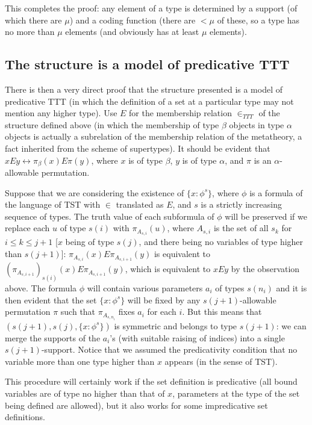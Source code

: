 \documentclass[112pt]{article}
\begin{document}
This completes the proof:  any element of a type is determined by a support (of which there are $\mu$) and a coding function (there are $<\mu$ of these, so a type has no more than $\mu$ elements (and obviously has at least $\mu$ elements).

\newpage
\subsection{The structure is a model of predicative TTT}

There is then a very direct proof that the structure presented is a model of predicative TTT (in which the definition of a set at a particular type may not mention any higher type).  Use $E$ for the membership relation $\in_{TTT}$ of the structure defined above (in which the membership of type $\beta$ objects in type $\alpha$ objects is actually a subrelation of the membership relation of the metatheory, a fact inherited from the scheme of supertypes).  It should be evident that $x E y \leftrightarrow \pi_\beta(x) E \pi(y)$,
where $x$ is of type $\beta$, $y$ is of type $\alpha$, and $\pi$ is an $\alpha$-allowable permutation.

Suppose that we are considering the existence of $\{x : \phi^s\}$, where $\phi$ is a formula of the language of TST with $\in$ translated as $E$, and $s$ is a strictly increasing sequence of types.  The truth value of each subformula of $\phi$ will be preserved if we replace each $u$ of type $s(i)$ with $\pi_{A_{s,i}}(u)$, where  $A_{s,i}$ is the set of all $s_k$ for $i \leq k \leq j+1$ [$x$ being of type $s(j)$, and there being no variables of type higher than $s(j+1)$]:  $\pi_{A_{s,i}}(x) E  \pi_{A_{s,i+1}}(y)$ is equivalent to $(\pi_{A_{s,i+1}})_{s(i)}(x) E \pi_{A_{s,i+1}}(y)$, which is equivalent to $xEy$ by the observation above. The formula $\phi$ will contain various parameters $a_i$ of types $s(n_i)$ and it is then evident that the set $\{x : \phi^s\}$ will be fixed by any $s(j+1)$-allowable permutation $\pi$ such that $\pi_{A_{s,n_i}}$ fixes $a_i$ for each $i$.  But this means that
$(s(j+1),s(j),\{x : \phi^s\})$ is symmetric and belongs to type $s(j+1)$:  we can merge the supports of the $a_i$'s (with suitable raising of indices) into a single $s(j+1)$-support.  Notice that we assumed the predicativity condition that no variable more than one type higher than $x$ appears (in the sense of TST).

This procedure will certainly work if the set definition is predicative (all bound variables are of type no higher than that of $x$, parameters at the type
of the set being defined are allowed), but it also works for some impredicative set definitions.
\end{document}
